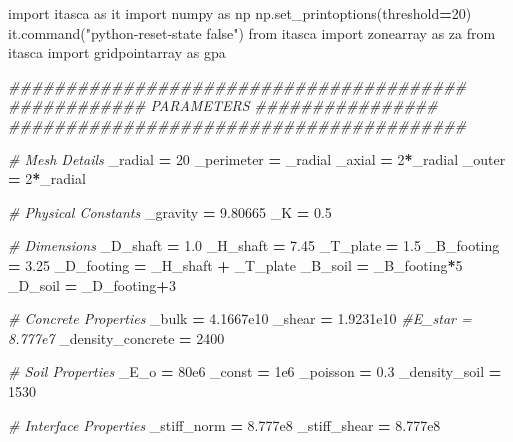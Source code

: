 \documentclass[a4paper, nobind]{templates/ociamthesis}
\newenvironment{Shaded}{\begin{snugshade}}{\end{snugshade}}
\newcommand{\CommentTok}[1]{\textcolor[rgb]{0.56,0.35,0.01}{\textit{#1}}}
\newcommand{\DecValTok}[1]{\textcolor[rgb]{0.00,0.00,0.81}{#1}}
\newcommand{\FloatTok}[1]{\textcolor[rgb]{0.00,0.00,0.81}{#1}}
\newcommand{\ImportTok}[1]{#1}
\newcommand{\NormalTok}[1]{#1}
\newcommand{\OperatorTok}[1]{\textcolor[rgb]{0.81,0.36,0.00}{\textbf{#1}}}
\newcommand{\StringTok}[1]{\textcolor[rgb]{0.31,0.60,0.02}{#1}}
\renewenvironment{Shaded}
{
  \vspace{10pt}%
  \begin{snugshade}%
}{%
  \end{snugshade}%
  \vspace{8pt}%
}
\begin{document}
\begin{Shaded}
\begin{Highlighting}[]
\ImportTok{import}\NormalTok{ itasca }\ImportTok{as}\NormalTok{ it}
\ImportTok{import}\NormalTok{ numpy }\ImportTok{as}\NormalTok{ np}
\NormalTok{np.set\_printoptions(threshold}\OperatorTok{=}\DecValTok{20}\NormalTok{)}
\NormalTok{it.command(}\StringTok{"python{-}reset{-}state false"}\NormalTok{)}
\ImportTok{from}\NormalTok{ itasca }\ImportTok{import}\NormalTok{ zonearray }\ImportTok{as}\NormalTok{ za}
\ImportTok{from}\NormalTok{ itasca }\ImportTok{import}\NormalTok{ gridpointarray }\ImportTok{as}\NormalTok{ gpa}

\CommentTok{\#\#\#\#\#\#\#\#\#\#\#\#\#\#\#\#\#\#\#\#\#\#\#\#\#\#\#\#\#\#\#\#\#\#\#\#\#\#\#\#}
\CommentTok{\#\#\#\#\#\#\#\#\#\#\#\# PARAMETERS \#\#\#\#\#\#\#\#\#\#\#\#\#\#\#\#}
\CommentTok{\#\#\#\#\#\#\#\#\#\#\#\#\#\#\#\#\#\#\#\#\#\#\#\#\#\#\#\#\#\#\#\#\#\#\#\#\#\#\#\#}

\CommentTok{\# Mesh Details}
\NormalTok{\_radial }\OperatorTok{=} \DecValTok{20}
\NormalTok{\_perimeter }\OperatorTok{=}\NormalTok{ \_radial}
\NormalTok{\_axial }\OperatorTok{=} \DecValTok{2}\OperatorTok{*}\NormalTok{\_radial}
\NormalTok{\_outer }\OperatorTok{=} \DecValTok{2}\OperatorTok{*}\NormalTok{\_radial}

\CommentTok{\# Physical Constants}
\NormalTok{\_gravity }\OperatorTok{=} \FloatTok{9.80665}
\NormalTok{\_K }\OperatorTok{=} \FloatTok{0.5}

\CommentTok{\# Dimensions}
\NormalTok{\_D\_shaft }\OperatorTok{=} \FloatTok{1.0}
\NormalTok{\_H\_shaft }\OperatorTok{=} \FloatTok{7.45}
\NormalTok{\_T\_plate }\OperatorTok{=} \FloatTok{1.5}
\NormalTok{\_B\_footing }\OperatorTok{=} \FloatTok{3.25}
\NormalTok{\_D\_footing }\OperatorTok{=}\NormalTok{ \_H\_shaft }\OperatorTok{+}\NormalTok{ \_T\_plate}
\NormalTok{\_B\_soil }\OperatorTok{=}\NormalTok{ \_B\_footing}\OperatorTok{*}\DecValTok{5}
\NormalTok{\_D\_soil }\OperatorTok{=}\NormalTok{ \_D\_footing}\OperatorTok{+}\DecValTok{3}

\CommentTok{\# Concrete Properties}
\NormalTok{\_bulk }\OperatorTok{=} \FloatTok{4.1667e10}
\NormalTok{\_shear }\OperatorTok{=} \FloatTok{1.9231e10} \CommentTok{\#E\_star = 8.777e7}
\NormalTok{\_density\_concrete }\OperatorTok{=} \DecValTok{2400}

\CommentTok{\# Soil Properties}
\NormalTok{\_E\_o }\OperatorTok{=} \FloatTok{80e6}
\NormalTok{\_const }\OperatorTok{=} \FloatTok{1e6}
\NormalTok{\_poisson }\OperatorTok{=} \FloatTok{0.3}
\NormalTok{\_density\_soil }\OperatorTok{=} \DecValTok{1530}

\CommentTok{\# Interface Properties}
\NormalTok{\_stiff\_norm }\OperatorTok{=} \FloatTok{8.777e8}
\NormalTok{\_stiff\_shear }\OperatorTok{=} \FloatTok{8.777e8}
\end{Highlighting}
\end{Shaded}
\end{document}
